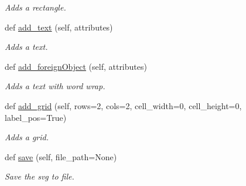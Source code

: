 \begin{DoxyCompactItemize}
\begin{DoxyCompactList}\small\item\em Adds a rectangle. \end{DoxyCompactList}\item 
def \hyperlink{classsylva_1_1base_1_1sylva__base_1_1_s_y_l_v_a_s_v_g_a436cbf76c9c95b2d5f5e9c2ff087bdb8}{add\+\_\+text} (self, attributes)
\begin{DoxyCompactList}\small\item\em Adds a text. \end{DoxyCompactList}\item 
def \hyperlink{classsylva_1_1base_1_1sylva__base_1_1_s_y_l_v_a_s_v_g_acc461814ddb36c877415dde5ba29d49b}{add\+\_\+foreign\+Object} (self, attributes)
\begin{DoxyCompactList}\small\item\em Adds a text with word wrap. \end{DoxyCompactList}\item 
def \hyperlink{classsylva_1_1base_1_1sylva__base_1_1_s_y_l_v_a_s_v_g_ac9c126a953f3e1108e8fc4c5674b5455}{add\+\_\+grid} (self, rows=2, cols=2, cell\+\_\+width=0, cell\+\_\+height=0, label\+\_\+pos=True)
\begin{DoxyCompactList}\small\item\em Adds a grid. \end{DoxyCompactList}\item 
def \hyperlink{classsylva_1_1base_1_1sylva__base_1_1_s_y_l_v_a_s_v_g_adc94584453d3c0bff2d798c0ae70ea24}{save} (self, file\+\_\+path=None)
\begin{DoxyCompactList}\small\item\em Save the svg to file. \end{DoxyCompactList}\end{DoxyCompactItemize}
